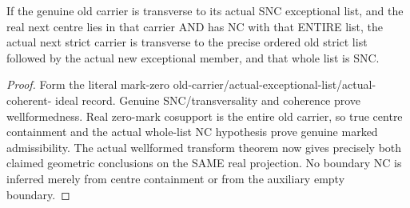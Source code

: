 \begin{theorem}
\label{hir:sharp-actual-chronological-centre-accumulated-exceptional-geometry}
\leanok
If the genuine old carrier is transverse to its actual SNC exceptional list,
and the real next centre lies in that carrier AND has NC with that ENTIRE
list, the actual next strict carrier is transverse to the precise ordered
old strict list followed by the actual new exceptional member, and that
whole list is SNC.
\end{theorem}
\begin{proof}
Form the literal mark-zero old-carrier/actual-exceptional-list/actual-coherent-
ideal record. Genuine SNC/transversality and coherence prove wellformedness.
Real zero-mark cosupport is the entire old carrier, so true centre containment
and the actual whole-list NC hypothesis prove genuine marked admissibility.
The actual wellformed transform theorem now gives precisely both claimed
geometric conclusions on the SAME real projection. No boundary NC is inferred
merely from centre containment or from the auxiliary empty boundary.
\end{proof}


